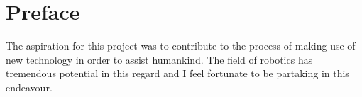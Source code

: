 \chapter*{Preface}

The aspiration for this project was to contribute to the process of making use of new technology in order to assist humankind. The field of robotics has tremendous potential in this regard and I feel fortunate to be partaking in this endeavour.